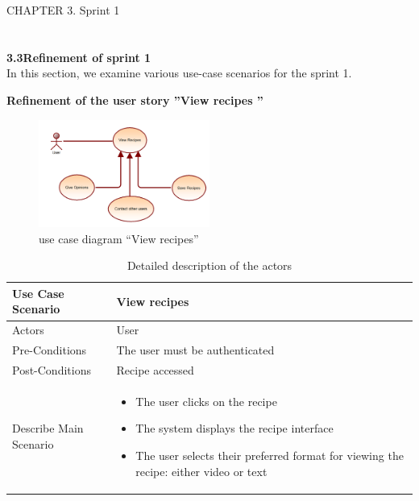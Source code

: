 \documentclass{article}
\begin{document}
{{{%
\newpage
\noindent
CHAPTER 3.  Sprint 1 \\
\underline{\hspace{\textwidth}} \vspace{0.2cm}\\
\\{\Large \textbf{3.3\hspace{1em}Refinement of sprint 1}}\vspace{0.2cm}
\\In this section, we examine various use-case scenarios for the sprint 1.\\
{\large \textbf{Refinement of the user story ”View recipes ”}
\begin{figure}[htbp]
    \centering
    \includegraphics[width=0.5\textwidth]{view}
    \caption{use case diagram “View recipes”}
    \label{fig:design2}
\end{figure}
\begin{table}[h]
    \centering
    \begin{tabularx}{\textwidth}{X|X}
        \toprule
        Use Case Scenario & View recipes  \\
        \midrule
        Actors & User \\
        \midrule
        Pre-Conditions &  The user must be authenticated \\
        \midrule
        Post-Conditions & Recipe accessed  \\
        \midrule
        Describe Main Scenario &  
        \begin{itemize}[label=$\bullet$]
            \item The user clicks on the recipe
            \item The system displays the recipe interface
            \item The user selects their preferred format for viewing the recipe: either video or text 
        \end{itemize} \\
        \bottomrule
    \end{tabularx}
    \caption{Detailed description of the actors}
    \label{tab:actors_roles}
\end{table}




}}}}
\end{document}
